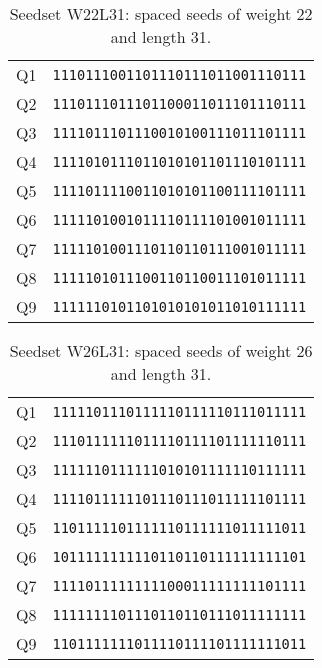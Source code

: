 \begin{table}[!ht]
	\centering
	\begin{tabular}{l r}
		Q1 & \verb|1110111001101110111011001110111| \\
		Q2 & \verb|1110111011101100011011101110111| \\
		Q3 & \verb|1111011101110010100111011101111| \\
		Q4 & \verb|1111010111011010101101110101111| \\
		Q5 & \verb|1111011110011010101100111101111| \\
		Q6 & \verb|1111101001011110111101001011111| \\
		Q7 & \verb|1111101001110110110111001011111| \\
		Q8 & \verb|1111101011100110110011101011111| \\
		Q9 & \verb|1111110101101010101011010111111| \\
		\bottomrule
	\end{tabular}
	\caption{Seedset W22L31: spaced seeds of weight 22 and length 31.}
	\label{tab:seedset-W22L31}
\end{table}


\begin{table}[!ht]
	\centering
	\begin{tabular}{l r}
		Q1 & \verb|1111101110111110111110111011111| \\
		Q2 & \verb|1110111111011110111101111110111| \\
		Q3 & \verb|1111110111111010101111110111111| \\
		Q4 & \verb|1111011111101110111011111101111| \\
		Q5 & \verb|1101111101111110111111011111011| \\
		Q6 & \verb|1011111111110110110111111111101| \\
		Q7 & \verb|1111011111111100011111111101111| \\
		Q8 & \verb|1111111101110110110111011111111| \\
		Q9 & \verb|1101111111011110111101111111011| \\
		\bottomrule
	\end{tabular}
	\caption{Seedset W26L31: spaced seeds of weight 26 and length 31.}
	\label{tab:seedset-W26L31}
\end{table}


